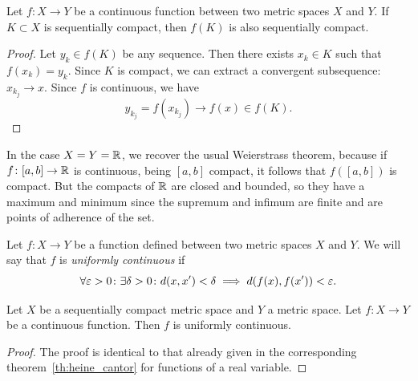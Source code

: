 \begin{theorem}
  \label{th:weiestrass_metrico}%
Let $f\colon X \to Y$ be a continuous function between
two metric spaces $X$ and $Y$.
If $K\subset X$ is sequentially compact, then
$f(K)$ is also sequentially compact.
\end{theorem}
%
\begin{proof}
Let $y_k \in f(K)$ be any sequence. Then
there exists $x_k \in K$ such that $f(x_k) = y_k$.
Since $K$ is compact, we can extract a convergent subsequence: $x_{k_j}\to x$.
Since $f$ is continuous, we have
\[
  y_{k_j} = f(x_{k_j}) \to f(x) \in f(K).
\]
\end{proof}

In the case $X=Y={\mathbb R}$, we recover the usual Weierstrass theorem, because if
$f\colon [a,b]\to {\mathbb R}$ is continuous, being $[a,b]$ compact, it follows that
$f([a,b])$ is compact. But the compacts of ${\mathbb R}$ are closed and bounded, so they
have a maximum and minimum since the supremum and infimum are finite and are
points of adherence of the set.

\begin{definition}
    Let $f\colon X \to Y$ be a function defined between two metric spaces $X$
  and $Y$.
  We will say that $f$ is \emph{uniformly continuous}%
 if 
  \[
  \forall \varepsilon>0 \colon \exists \delta>0 \colon 
    d(x,x')< \delta \implies d(f(x),f(x'))<\varepsilon. 
  \]
\end{definition}

\begin{theorem}
  \label{th:HeineCantor}
Let $X$ be a sequentially compact metric space and $Y$ a metric space.
Let $f\colon X\to Y$ be a continuous function. Then $f$ is uniformly continuous.
\end{theorem}
%
\begin{proof}
  The proof is identical to that already given in the corresponding 
  theorem~\ref{th:heine_cantor} for functions of a real variable.
\end{proof}